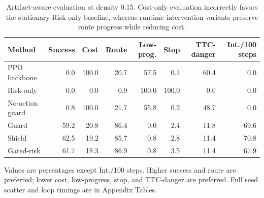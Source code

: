 
\begin{table}[t]
\centering
\caption{Artifact-aware evaluation at density 0.15. Cost-only evaluation incorrectly favors the stationary Risk-only baseline, whereas runtime-intervention variants preserve route progress while reducing cost.}
\label{tab_core_mechanism}
\scriptsize
\setlength{\tabcolsep}{3.4pt}
\renewcommand{\arraystretch}{1.08}
\begin{tabular}{@{}lrrrrrrr@{}}
\toprule
Method & Success & Cost & Route & Low-prog. & Stop & TTC-danger & Int./100 steps \\
\midrule
PPO backbone & 0.0 & 100.0 & 20.7 & 57.5 & 0.1 & 60.4 & 0.0 \\
Risk-only & 0.0 & 0.0 & 0.9 & 100.0 & 100.0 & 0.0 & 0.0 \\
No-action guard & 0.8 & 100.0 & 21.7 & 55.8 & 0.2 & 48.7 & 0.0 \\
Guard & 59.2 & 20.8 & 86.4 & 0.0 & 2.4 & 11.8 & 69.6 \\
Shield & 62.5 & 19.2 & 85.7 & 0.8 & 2.8 & 11.4 & 70.8 \\
Gated-risk & 61.7 & 18.3 & 86.9 & 0.8 & 3.5 & 11.4 & 67.9 \\
\bottomrule
\end{tabular}
\begin{tablenotes}
\item Values are percentages except Int./100 steps. Higher success and route are preferred; lower cost, low-progress, stop, and TTC-danger are preferred. Full seed scatter and loop timings are in Appendix Tables.
\end{tablenotes}
\end{table}
